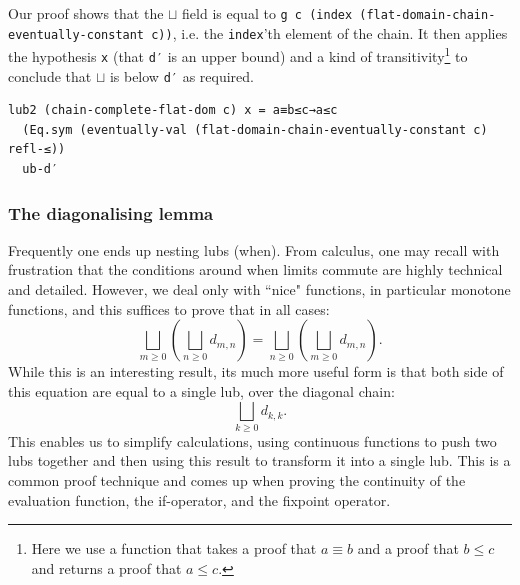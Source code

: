 \documentclass[12pt,a4paper,twoside,openright]{report}
\begin{document}
\begin{itemize}
Our proof shows that the $\sqcup$ field is equal to \texttt{g c (index (flat-domain-chain-eventually-constant c))}, i.e. the \texttt{index}'th element of the chain. It then applies the hypothesis \texttt{x} (that \texttt{d′} is an upper bound) and a kind of transitivity\footnote{Here we use a function that takes a proof that $a \equiv b$ and a proof that $b \leq c$ and returns a proof that $a \leq c$.} to conclude that $\sqcup$ is below \texttt{d′} as required. 
\begin{verbatim}
lub2 (chain-complete-flat-dom c) x = a≡b≤c→a≤c
  (Eq.sym (eventually-val (flat-domain-chain-eventually-constant c) refl-≤))
  ub-d′
\end{verbatim}
\end{itemize}
\subsubsection{The diagonalising lemma}
Frequently one ends up nesting lubs (when). From calculus, one may recall with frustration that the conditions around when limits commute are highly technical and detailed. However, we deal only with ``nice" functions, in particular monotone functions, and this suffices to prove that in all cases:
\begin{equation} \label{comm-double-lub}
\bigsqcup_{m \geq 0} \left( \bigsqcup_{n \geq 0} d_{m, n}\right) = 	\bigsqcup_{n \geq 0} \left( \bigsqcup_{m \geq 0} d_{m, n}\right).
\end{equation}
While this is an interesting result, its much more useful form is that both side of this equation are equal to a single lub, over the diagonal chain:
\begin{equation} \label{diag}
\bigsqcup_{k \geq 0} d_{k, k}.
\end{equation}
This enables us to simplify calculations, using continuous functions to push two lubs together and then using this result to transform it into a single lub. This is a common proof technique and comes up when proving the continuity of the evaluation function, the if-operator, and the fixpoint operator. 
\end{document}

